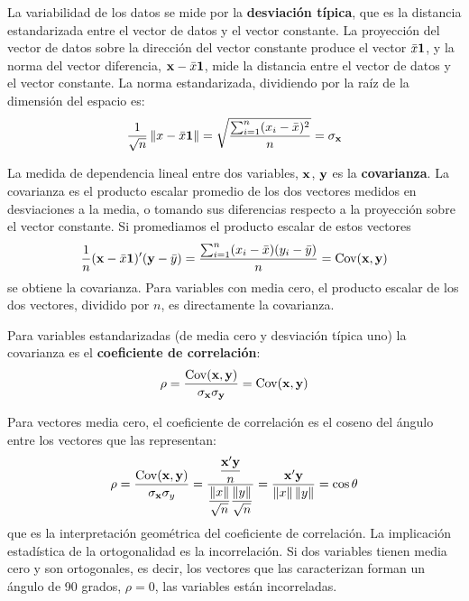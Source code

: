 La variabilidad de los datos se mide por la \textbf{desviación típica}, que es la distancia estandarizada entre el vector de datos y el vector constante. La proyección del vector de datos sobre la dirección del vector constante produce el vector $\bar{x}\mathbf{1}$, y la norma del vector diferencia, $\mathbf{x}-\bar{x}\mathbf{1}$, mide la distancia entre el vector de datos y el vector constante. La norma estandarizada, dividiendo por la raíz de la dimensión del espacio es:
$$\frac{1}{\sqrt{n}}\left\| x-\bar{x}\mathbf{1}\right\|=\sqrt{\frac{\sum_{i=1}^n(x_i-\bar{x})^2}{n}}=\sigma_{\mathbf{x}}$$

La medida de dependencia lineal entre dos variables, $\mathbf{x}$, $\mathbf{y}$ es la \textbf{covarianza}. La covarianza es el producto escalar promedio de los dos vectores medidos en desviaciones a la media, o tomando sus diferencias respecto a la proyección sobre el vector constante. Si promediamos el producto escalar de estos vectores
$$\frac{1}{n}(\mathbf{x}-\bar{x}\mathbf{1})'(\mathbf{y}-\bar{y})=\frac{\sum_{i=1}^n(x_i-\bar{x})(y_i-\bar{y})}{n}=\operatorname{Cov}(\mathbf{x},\mathbf{y})$$
se obtiene la covarianza. Para variables con media cero, el producto escalar de los dos vectores, dividido por $n$, es directamente la covarianza.

Para variables estandarizadas (de media cero y desviación típica uno) la covarianza es el \textbf{coeficiente de correlación}:
$$\rho=\frac{\operatorname{Cov}(\mathbf{x},\mathbf{y})}{\sigma_{\mathbf{x}}\sigma_{\mathbf{y}}}=\operatorname{Cov}(\mathbf{x},\mathbf{y})$$

Para vectores media cero, el coeficiente de correlación es el coseno del ángulo entre los vectores que las representan:
$$\rho=\frac{\operatorname{Cov}(\mathbf{x},\mathbf{y})}{\sigma_{\mathbf{x}}\sigma_y}=\frac{\dfrac{\mathbf{x}'\mathbf{y}}{n}}{\dfrac{\left\| x\right\|}{\sqrt{n}}\dfrac{\left\| y\right\|}{\sqrt{n}}}=\frac{\mathbf{x}'\mathbf{y}}{\left\| x\right\|\left\| y\right\|}=\cos\theta$$
que es la interpretación geométrica del coeficiente de correlación. La implicación estadística de la ortogonalidad es la incorrelación. Si dos variables tienen media cero y son ortogonales, es decir, los vectores que las caracterizan forman un ángulo de 90 grados, $\rho =0$, las variables están incorreladas.




